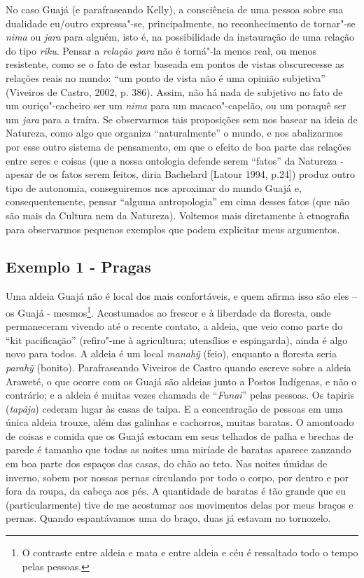 No caso Guajá (e parafraseando Kelly), a consciência de uma pessoa sobre
sua dualidade eu/outro expressa"-se, principalmente, no reconhecimento de
tornar"-se \emph{nima} ou \emph{jara} para alguém, isto é, na
possibilidade da instauração de uma relação do tipo \emph{riku}. Pensar
a \emph{relação para} não é torná"-la menos real, ou menos resistente,
como se o fato de estar baseada em pontos de vistas obscurecesse as
relações reais no mundo: ``um ponto de vista não é uma opinião subjetiva''
(Viveiros de Castro, 2002, p. 386). Assim, não há nada de subjetivo no
fato de um ouriço"-cacheiro ser um \emph{nima} para um macaco"-capelão, ou
um poraquê ser um \emph{jara} para a traíra. Se observarmos tais
proposições sem nos basear na ideia de Natureza, como algo que organiza
``naturalmente'' o mundo, e nos abalizarmos por esse outro sistema de
pensamento, em que o efeito de boa parte das relações entre seres e
coisas (que a nossa ontologia defende serem ``fatos'' da Natureza -
apesar de os fatos serem feitos, diria Bachelard {[}Latour 1994,
p.24{]}) produz outro tipo de autonomia, conseguiremos nos aproximar do
mundo Guajá e, consequentemente, pensar ``alguma antropologia'' em cima
desses fatos (que não são mais da Cultura nem da Natureza). Voltemos
mais diretamente à etnografia para observarmos pequenos exemplos que
podem explicitar meus argumentos.

\subsection{Exemplo 1 - Pragas}

Uma aldeia Guajá não é local dos mais confortáveis, e quem afirma isso
são eles -- os Guajá - mesmos\footnote{O contraste entre aldeia e mata e
  entre aldeia e céu é ressaltado todo o tempo pelas pessoas.}.
Acostumados ao frescor e à liberdade da floresta, onde permaneceram
vivendo até o recente contato, a aldeia, que veio como parte do ``kit
pacificação'' (refiro"-me à agricultura; utensílios e espingarda), ainda
é algo novo para todos. A aldeia é um local \emph{manahỹ} (feio),
enquanto a floresta seria \emph{parahỹ} (bonito). Parafraseando Viveiros
de Castro quando escreve sobre a aldeia Araweté, o que ocorre com os
Guajá são aldeias junto a Postos Indígenas, e não o contrário; e a
aldeia é muitas vezes chamada de ``\emph{Funai}'' pelas pessoas. Os
tapiris (\emph{tapãja}) cederam lugar às casas de taipa. E a
concentração de pessoas em uma única aldeia trouxe, além das galinhas e
cachorros, muitas baratas. O amontoado de coisas e comida que os Guajá
estocam em seus telhados de palha e brechas de parede é tamanho que
todas as noites uma miríade de baratas aparece zanzando em boa parte dos
espaços das casas, do chão ao teto. Nas noites úmidas de inverno, sobem
por nossas pernas circulando por todo o corpo, por dentro e por fora da
roupa, da cabeça aos pés. A quantidade de baratas é tão grande que eu
(particularmente) tive de me acostumar aos movimentos delas por meus
braços e pernas. Quando espantávamos uma do braço, duas já estavam no
tornozelo.

